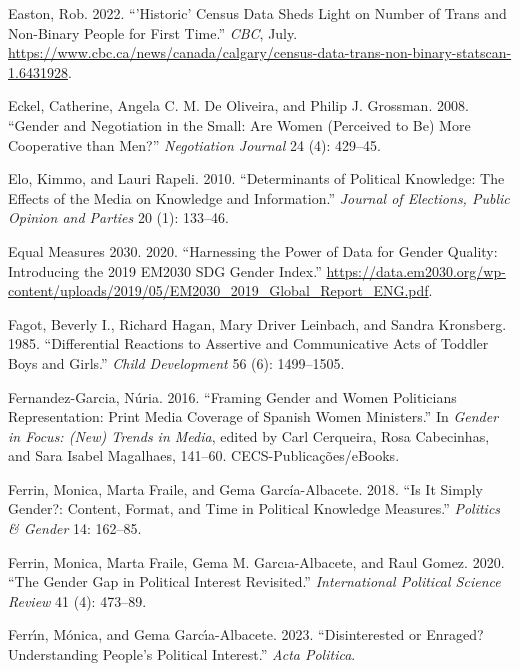 \documentclass[
  letterpaper,
  DIV=11,
  numbers=noendperiod]{scrreprt}
\newlength{\cslhangindent}
\newenvironment{CSLReferences}[2] %
 {\begin{list}{}{%
  \setlength{\itemindent}{0pt}
  \setlength{\leftmargin}{0pt}
  \setlength{\parsep}{0pt}
  \ifodd #1
   \setlength{\leftmargin}{\cslhangindent}
   \setlength{\itemindent}{-1\cslhangindent}
  \fi
  \setlength{\itemsep}{#2\baselineskip}}}
 {\end{list}}
\begin{document}
\begin{CSLReferences}{1}{0}
Easton, Rob. 2022. {``'Historic' Census Data Sheds Light on Number of
Trans and Non-Binary People for First Time.''} \emph{CBC}, July.
\url{https://www.cbc.ca/news/canada/calgary/census-data-trans-non-binary-statscan-1.6431928}.

Eckel, Catherine, Angela C. M. De Oliveira, and Philip J. Grossman.
2008. {``{Gender and Negotiation in the Small: Are Women (Perceived to
Be) More Cooperative than Men?}''} \emph{Negotiation Journal} 24 (4):
429--45.

Elo, Kimmo, and Lauri Rapeli. 2010. {``{Determinants of Political
Knowledge: The Effects of the Media on Knowledge and Information}.''}
\emph{Journal of Elections, Public Opinion and Parties} 20 (1): 133--46.

Equal Measures 2030. 2020. {``{Harnessing the Power of Data for Gender
Quality: Introducing the 2019 EM2030 SDG Gender Index}.''}
\url{https://data.em2030.org/wp-content/uploads/2019/05/EM2030_2019_Global_Report_ENG.pdf}.

Fagot, Beverly I., Richard Hagan, Mary Driver Leinbach, and Sandra
Kronsberg. 1985. {``{Differential Reactions to Assertive and
Communicative Acts of Toddler Boys and Girls}.''} \emph{Child
Development} 56 (6): 1499--1505.

Fernandez-Garcia, Núria. 2016. {``{Framing Gender and Women Politicians
Representation: Print Media Coverage of Spanish Women Ministers}.''} In
\emph{{Gender in Focus: (New) Trends in Media}}, edited by Carl
Cerqueira, Rosa Cabecinhas, and Sara Isabel Magalhaes, 141--60.
CECS-Publica{ç}{õ}es/eBooks.

Ferrin, Monica, Marta Fraile, and Gema García-Albacete. 2018. {``{Is It
Simply Gender?: Content, Format, and Time in Political Knowledge
Measures}.''} \emph{Politics \& Gender} 14: 162--85.

Ferrin, Monica, Marta Fraile, Gema M. Garcıa-Albacete, and Raul Gomez.
2020. {``{The Gender Gap in Political Interest Revisited}.''}
\emph{International Political Science Review} 41 (4): 473--89.

Ferrı́n, Mónica, and Gema Garcı́a-Albacete. 2023. {``{Disinterested or
Enraged? Understanding People's Political Interest}.''} \emph{Acta
Politica}.


\end{CSLReferences}
\end{document}
